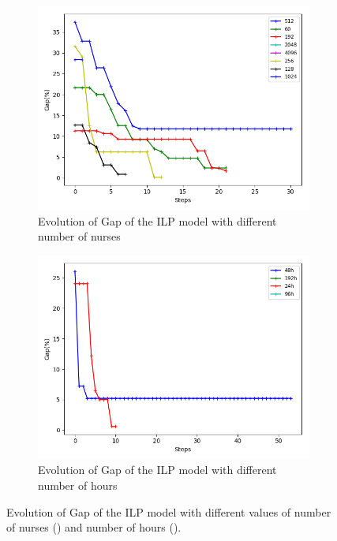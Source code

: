 \begin{figure}[h!]

\begin{subfigure}[b]{.49\linewidth}
\centering
\includegraphics[width=\linewidth]{./img/instances_nurses_ilp_evol.png}
\caption{ Evolution of Gap of the ILP model with different number of nurses}\label{fig1a}
\end{subfigure}%
\begin{subfigure}[b]{.49\linewidth}
\centering
\includegraphics[width=\linewidth]{./img/instances_hours_ilp_evol.png}
\caption{ Evolution of Gap of the ILP model with different number of hours }\label{fig1b}
\end{subfigure}\vfill
\caption{Evolution of Gap of the ILP model with different values of number of nurses () and number of hours (). }
\label{fig_ilp_size}
\end{figure}


